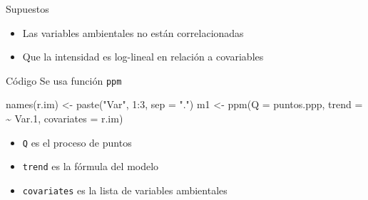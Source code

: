 \documentclass[
  11pt,
  ignorenonframetext,
]{beamer}
\newenvironment{Shaded}{}{}
\newcommand{\AttributeTok}[1]{\textcolor[rgb]{0.49,0.56,0.16}{#1}}
\newcommand{\DecValTok}[1]{\textcolor[rgb]{0.25,0.63,0.44}{#1}}
\newcommand{\FloatTok}[1]{\textcolor[rgb]{0.25,0.63,0.44}{#1}}
\newcommand{\FunctionTok}[1]{\textcolor[rgb]{0.02,0.16,0.49}{#1}}
\newcommand{\NormalTok}[1]{#1}
\newcommand{\OtherTok}[1]{\textcolor[rgb]{0.00,0.44,0.13}{#1}}
\newcommand{\SpecialCharTok}[1]{\textcolor[rgb]{0.25,0.44,0.63}{#1}}
\newcommand{\StringTok}[1]{\textcolor[rgb]{0.25,0.44,0.63}{#1}}
\providecommand{\tightlist}{%
  \setlength{\itemsep}{0pt}\setlength{\parskip}{0pt}}
\begin{document}
\begin{frame}{Supuestos}
\protect\hypertarget{supuestos}{}
\begin{itemize}
\tightlist
\item
  Las variables ambientales no están correlacionadas
\item
  Que la intensidad es log-lineal en relación a covariables
\end{itemize}
\end{frame}

\begin{frame}[fragile]{Código}
\protect\hypertarget{cuxf3digo}{}
Se usa función \texttt{ppm}

\begin{Shaded}
\begin{Highlighting}[]
\FunctionTok{names}\NormalTok{(r.im) }\OtherTok{\textless{}{-}} \FunctionTok{paste}\NormalTok{(}\StringTok{"Var"}\NormalTok{, }\DecValTok{1}\SpecialCharTok{:}\DecValTok{3}\NormalTok{, }\AttributeTok{sep =} \StringTok{"."}\NormalTok{)}
\NormalTok{m1 }\OtherTok{\textless{}{-}} \FunctionTok{ppm}\NormalTok{(}\AttributeTok{Q =}\NormalTok{ puntos.ppp,}
          \AttributeTok{trend =} \SpecialCharTok{\textasciitilde{}}\NormalTok{ Var}\FloatTok{.1}\NormalTok{,}
          \AttributeTok{covariates =}\NormalTok{ r.im)}
\end{Highlighting}
\end{Shaded}

\begin{itemize}
\tightlist
\item
  \texttt{Q} es el proceso de puntos
\item
  \texttt{trend} es la fórmula del modelo
\item
  \texttt{covariates} es la lista de variables ambientales
\end{itemize}
\end{frame}
\end{document}
